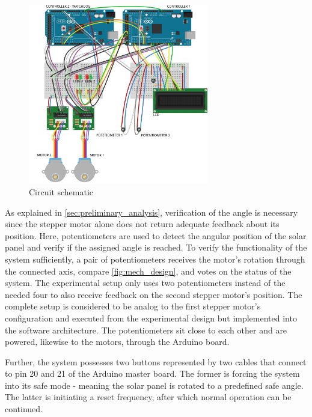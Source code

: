 \begin{figure}[H]
    \centering
   \includegraphics[width=0.7\textwidth]{figures/circuit.jpg}
    \caption{Circuit schematic}
     \label{fig:circuit_schematic}
\end{figure}

As explained in \autoref{sec:preliminary_analysis}, verification of the angle is necessary since the stepper motor alone does not return adequate feedback about its position.  Here, potentiometers are used to detect the angular position of the solar panel and verify if the assigned angle is reached. To verify the functionality of the system sufficiently, a pair of potentiometers receives the motor's rotation through the connected axis, compare \autoref{fig:mech_design}, and votes on the status of the system. The experimental setup only uses two potentiometers instead of the needed four to also receive feedback on the second stepper motor's position. The complete setup is considered to be analog to the first stepper motor's configuration and executed from the experimental design but implemented into the software architecture. The potentiometers sit close to each other and are powered, likewise to the motors, through the Arduino board.

Further, the system possesses two buttons represented by two cables that connect to pin 20 and 21 of the Arduino master board. The former is forcing the system into its safe mode - meaning the solar panel is rotated to a predefined safe angle. The latter is initiating a reset frequency, after which normal operation can be continued.

